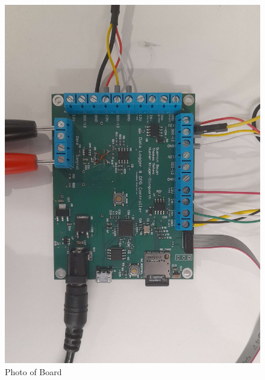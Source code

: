 \begin{figure}[ht]
    \centering
    \begin{minipage}[b]{0.4\linewidth}
        \centering
        \includegraphics[width=\linewidth]{figures/board_photo.jpg}
        \caption{Photo of Board}
        \label{board_photo}
    \end{minipage}
    \hfill
    \begin{minipage}[b]{0.4\linewidth}
        \centering

\end{minipage}
\end{figure}
